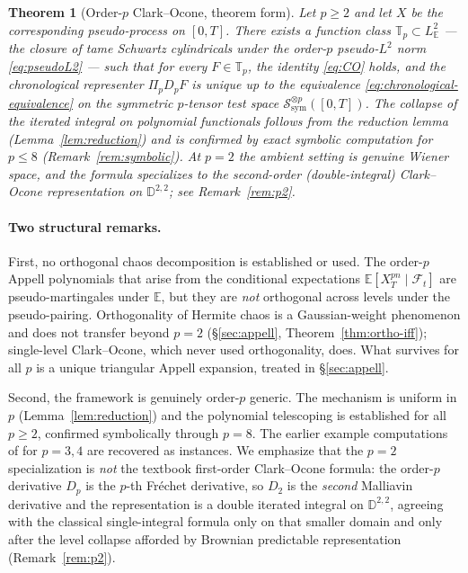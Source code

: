 \documentclass[11pt,reqno]{amsart}
\theoremstyle{plain}
\newtheorem{theorem}{Theorem}[section]
\theoremstyle{definition}
\newcommand{\E}{\mathbb{E}}
\newcommand{\sym}{\mathrm{sym}}
\newcommand{\Schw}{\mathcal{S}}
\begin{document}
\begin{theorem}[Order-$p$ Clark--Ocone, theorem form]
\label{thm:main}
Let $p \geq 2$ and let $X$ be the corresponding pseudo-process on $[0,T]$. There exists a function class $\mathbb{T}_p \subset L^2_\E$ --- the closure of tame Schwartz cylindricals under the order-$p$ pseudo-$L^2$ norm \eqref{eq:pseudoL2} --- such that for every $F \in \mathbb{T}_p$, the identity \eqref{eq:CO} holds, and the chronological representer $\Pi_p D_p F$ is unique up to the equivalence \eqref{eq:chronological-equivalence} on the symmetric $p$-tensor test space $\Schw_{\sym}^{\otimes p}([0,T])$. The collapse of the iterated integral on polynomial functionals follows from the reduction lemma (Lemma~\ref{lem:reduction}) and is confirmed by exact symbolic computation for $p \leq 8$ (Remark~\ref{rem:symbolic}). At $p=2$ the ambient setting is genuine Wiener space, and the formula specializes to the second-order (double-integral) Clark--Ocone representation on $\mathbb{D}^{2,2}$; see Remark~\ref{rem:p2}.
\end{theorem}

\paragraph{Two structural remarks.}
First, no orthogonal chaos decomposition is established or used. The order-$p$ Appell polynomials that arise from the conditional expectations $\E[X_T^{pn} \mid \mathcal{F}_t]$ are pseudo-martingales under $\E$, but they are \emph{not} orthogonal across levels under the pseudo-pairing. Orthogonality of Hermite chaos is a Gaussian-weight phenomenon and does not transfer beyond $p=2$ (\S\ref{sec:appell}, Theorem~\ref{thm:ortho-iff}); single-level Clark--Ocone, which never used orthogonality, does. What survives for all $p$ is a unique triangular Appell expansion, treated in \S\ref{sec:appell}.

Second, the framework is genuinely order-$p$ generic. The mechanism is uniform in $p$ (Lemma~\ref{lem:reduction}) and the polynomial telescoping is established for all $p \geq 2$, confirmed symbolically through $p=8$. The earlier example computations of \cite{operatorDerivativeII} for $p=3,4$ are recovered as instances. We emphasize that the $p=2$ specialization is \emph{not} the textbook first-order Clark--Ocone formula: the order-$p$ derivative $D_p$ is the $p$-th Fréchet derivative, so $D_2$ is the \emph{second} Malliavin derivative and the representation is a double iterated integral on $\mathbb{D}^{2,2}$, agreeing with the classical single-integral formula only on that smaller domain and only after the level collapse afforded by Brownian predictable representation (Remark~\ref{rem:p2}).
\end{document}
